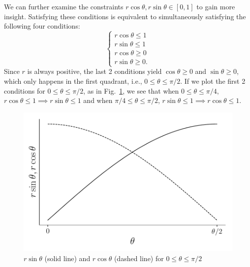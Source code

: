 \begin{problem}{30}
We can further examine the constraints $r\cos \theta ,r \sin \theta \in [0, 1]$ to gain more insight.  Satisfying these conditions is equivalent to simultaneously satisfying the following four conditions:
\[
\begin{cases}
               r \cos \theta \le 1\\
               r \sin \theta \le 1\\
               r \cos \theta \ge 0\\
               r \sin \theta \ge 0.
            \end{cases}
\]
Since $r$ is always positive, the last 2 conditions yield $\cos \theta \ge 0 $ and $\sin \theta \ge 0$, which only happens in the first quadrant, i.e., $0 \le \theta \le \pi/2$.  If we plot the first 2 conditions for $0 \le \theta \le \pi/2$, as in Fig.~\ref{fig:prob_30}, we see that when $0 \le \theta \le \pi/4$, $r \cos \theta \le 1 \implies r \sin \theta \le 1$ and when $\pi/4 \le \theta \le \pi/2$, $r \sin \theta \le 1 \implies r \cos \theta \le 1$.

	\begin{figure}[t]
	\centering
      		 \includegraphics[totalheight=6cm]{chpt5/prob30.pdf}
  			  \caption{$r \sin \theta$ (solid line) and $r \cos \theta$ (dashed line) for $0 \le \theta \le \pi/2$}
    			   \label{fig:prob_30}
	\end{figure}
	

\end{problem}
